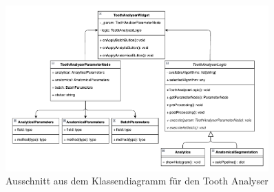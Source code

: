 \begin{figure}[h]
	\centering
	\includegraphics[width=0.9\textwidth]{
		img/tooth_analyser_class_diagram_light.png
	}
	\caption{Ausschnitt aus dem Klassendiagramm für den Tooth Analyser}
	\label{fig:klassendiagramm}
\end{figure}

